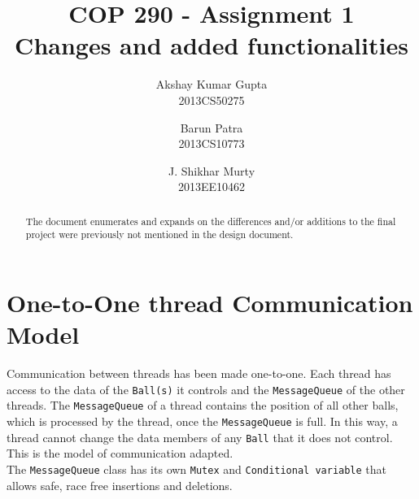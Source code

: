 \documentclass[]{article}
\begin{document}
\title{COP 290 - Assignment 1\\Changes and added functionalities}
\author{Akshay Kumar Gupta\\ 2013CS50275 \and  Barun Patra\\{2013CS10773} \and J. Shikhar Murty\\{2013EE10462}}
\date{}
\maketitle
\begin{flushleft}
\begin{abstract}
\noindent The document enumerates and expands on the differences and/or additions to the final project were previously not mentioned in the design document.
\end{abstract}
\end{flushleft} 
\section{One-to-One thread Communication Model }
Communication between threads has been made one-to-one. Each thread has access to the data of the \texttt{Ball(s)} it controls and the \texttt{MessageQueue} of the other threads. The \texttt{MessageQueue} of a thread contains the position of all other balls, which is processed by the thread, once the \texttt{MessageQueue} is full. In this way, a thread cannot change the data members of any \texttt{Ball} that it does not control. This is the model of communication adapted. \\
The \texttt{MessageQueue} class has its own \texttt{Mutex} and \texttt{Conditional variable} that allows safe, race free insertions and deletions.  
\end{document}
